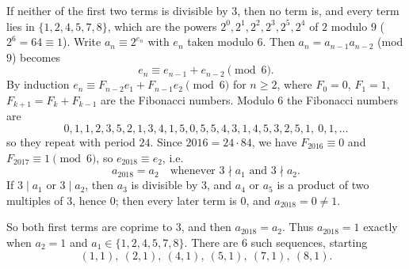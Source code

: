 If neither of the first two terms is divisible by $3$, then no term is, and every term lies in $\{1,2,4,5,7,8\}$, which are the powers $2^0,2^1,2^2,2^3,2^5,2^4$ of $2$ modulo $9$ ($2^6=64\equiv1$). Write $a_n\equiv2^{e_n}$ with $e_n$ taken modulo $6$. Then $a_n=a_{n-1}a_{n-2}$ (mod $9$) becomes
\[
e_n\equiv e_{n-1}+e_{n-2}\pmod 6 .
\]
By induction $e_n\equiv F_{n-2}e_1+F_{n-1}e_2\pmod6$ for $n\ge2$, where $F_0=0$, $F_1=1$, $F_{k+1}=F_k+F_{k-1}$ are the Fibonacci numbers. Modulo $6$ the Fibonacci numbers are
\[
0,1,1,2,3,5,2,1,3,4,1,5,0,5,5,4,3,1,4,5,3,2,5,1,\ 0,1,\dots
\]
so they repeat with period $24$. Since $2016=24\cdot84$, we have $F_{2016}\equiv0$ and $F_{2017}\equiv1\pmod 6$, so $e_{2018}\equiv e_2$, i.e.
\[
a_{2018}=a_2\quad\text{whenever }3\nmid a_1\text{ and }3\nmid a_2 .
\]
If $3\mid a_1$ or $3\mid a_2$, then $a_3$ is divisible by $3$, and $a_4$ or $a_5$ is a product of two multiples of $3$, hence $0$; then every later term is $0$, and $a_{2018}=0\ne1$.

So both first terms are coprime to $3$, and then $a_{2018}=a_2$. Thus $a_{2018}=1$ exactly when $a_2=1$ and $a_1\in\{1,2,4,5,7,8\}$. There are $\boxed{6}$ such sequences, starting
\[
(1,1),\ (2,1),\ (4,1),\ (5,1),\ (7,1),\ (8,1).
\]

